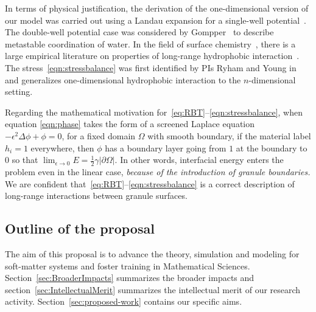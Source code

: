In terms of physical justification, the derivation of the
one-dimensional version of our model was carried out using a Landau
expansion for a single-well potential~\cite{MaRa76, ErLjCl89}.
The double-well potential case was
considered by Gompper~\cite{GoHaKo94} to describe metastable
coordination of water. In the field of surface
chemistry~\cite{Israelachvili1954}, there is a large empirical
literature on properties of long-range hydrophobic
interaction~\cite{LeRaPa77, KoNa15, Nagle17, Lum1999, Lin2005,
Meyer2006, Ducker2016, Jackson2016, Gletal88, Aketal17, Ch05}. The
stress~\eqref{eqn:stressbalance} was first identified by PIs Ryham and
Young in~\cite{Fu2018_SIAM} and generalizes one-dimensional hydrophobic
interaction to the $n$-dimensional setting. 

Regarding the mathematical motivation for~\eqref{eq:RBT}--\eqref{eqn:stressbalance},
when equation \eqref{eqn:phase} takes the form of a screened Laplace equation
$-\epsilon^2 \Delta \phi + \phi =0$, for a fixed domain $\Omega$ with
smooth boundary, if the material label $h_i = 1$
everywhere, then $\phi$ has a boundary layer going from $1$ at the
boundary to $0$ so that 
$\lim_{\epsilon \to 0} E = \frac{1}{2}\gamma |\partial \Omega|$.
In other words, 
interfacial energy enters the problem even in the linear case,
\emph{because of the introduction of granule boundaries.}
We are confident
that~\eqref{eq:RBT}--\eqref{eqn:stressbalance} is a correct description
of long-range interactions between granule surfaces.


\subsection{Outline of the proposal}
The aim of this proposal is to advance the theory, simulation and
modeling for soft-matter systems and foster training in Mathematical
Sciences.  Section~\ref{sec:BroaderImpacts} summarizes the broader
impacts and section~\ref{sec:IntellectualMerit} summarizes the
intellectual merit of our research activity.
Section~\ref{sec:proposed-work} contains our specific aims.




